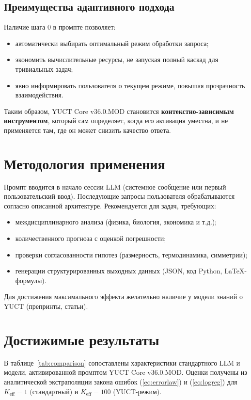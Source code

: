 \documentclass[12pt,a4paper]{article}
\begin{document}
\subsection{Преимущества адаптивного подхода}
Наличие шага 0 в промпте позволяет:
\begin{itemize}
	\item автоматически выбирать оптимальный режим обработки запроса;
	\item экономить вычислительные ресурсы, не запуская полный каскад для тривиальных задач;
	\item явно информировать пользователя о текущем режиме, повышая прозрачность взаимодействия.
\end{itemize}

Таким образом, YUCT Core v36.0.MOD становится \textbf{контекстно-зависимым инструментом}, который сам определяет, когда его активация уместна, и не применяется там, где он может снизить качество ответа.

	\section{Методология применения}
	Промпт вводится в начало сессии LLM (системное сообщение или первый пользовательский ввод). Последующие запросы пользователя обрабатываются согласно описанной архитектуре. Рекомендуется для задач, требующих:
	\begin{itemize}
		\item междисциплинарного анализа (физика, биология, экономика и т.д.);
		\item количественного прогноза с оценкой погрешности;
		\item проверки согласованности гипотез (размерность, термодинамика, симметрии);
		\item генерации структурированных выходных данных (JSON, код Python, LaTeX-формулы).
	\end{itemize}
	Для достижения максимального эффекта желательно наличие у модели знаний о YUCT (препринты, статьи).
	
	\section{Достижимые результаты}
	В таблице~\ref{tab:comparison} сопоставлены характеристики стандартного LLM и модели, активированной промптом YUCT Core v36.0.MOD. Оценки получены из аналитической экстраполяции закона ошибок (\ref{eq:errorlaw}) и (\ref{eq:logreg}) для \(K_{\mathrm{eff}}=1\) (стандартный) и \(K_{\mathrm{eff}}=100\) (YUCT-режим).
	
\end{document}
